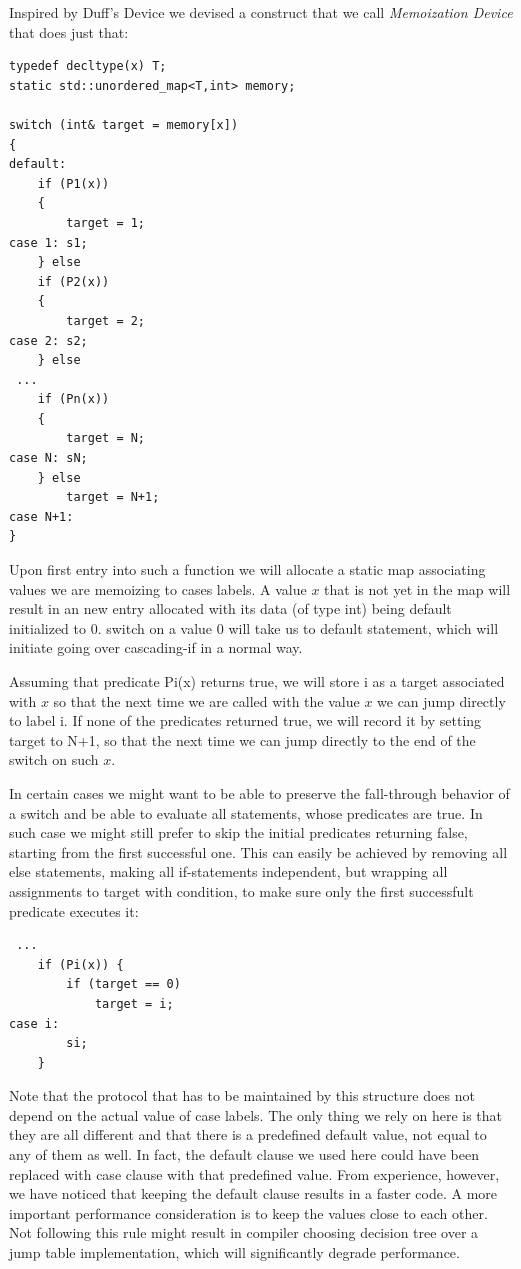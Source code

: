 \documentclass[preprint]{sigplanconf}
\begin{document}
Inspired by Duff's Device\cite{Duff} we devised a construct that we call 
\emph{Memoization Device} that does just that:

\begin{lstlisting}
typedef decltype(x) T;
static std::unordered_map<T,int> memory;

switch (int& target = memory[x])
{
default:
    if (P1(x)) 
    {
        target = 1;
case 1: s1;
    } else 
    if (P2(x)) 
    {
        target = 2;
case 2: s2;
    } else
 ...
    if (Pn(x)) 
    {
        target = N;
case N: sN;
    } else
        target = N+1;
case N+1:
}
\end{lstlisting}

Upon first entry into such a function we will allocate a static map associating 
values we are memoizing to cases labels. A value $x$ that is not yet in the map 
will result in an new entry allocated with its data (of type int) being default 
initialized to 0. switch on a value 0 will take us to default statement, which 
will initiate going over cascading-if in a normal way. 

Assuming that predicate Pi(x) returns true, we will store i as a target 
associated with $x$ so that the next time we are called with the value $x$ we 
can jump directly to label i. If none of the predicates returned true, we will 
record it by setting target to N+1, so that the next time we can jump directly 
to the end of the switch on such $x$. 

In certain cases we might want to be able to preserve the fall-through behavior 
of a switch and be able to evaluate all statements, whose predicates are true. 
In such case we might still prefer to skip the initial predicates returning 
false, starting from the first successful one. This can easily be achieved by 
removing all else statements, making all if-statements independent, but wrapping 
all assignments to target with condition, to make sure only the first 
successfult predicate executes it:

\begin{lstlisting}
 ...
    if (Pi(x)) { 
        if (target == 0)
            target = i;
case i:
        si;
    }
\end{lstlisting}

Note that the protocol that has to be maintained by this structure does not 
depend on the actual value of case labels. The only thing we rely on here is 
that they are all different and that there is a predefined default value, not 
equal to any of them as well. In fact, the default clause we used here could 
have been replaced with case clause with that predefined value. From experience,
however, we have noticed that keeping the default clause results in a faster 
code. A more important performance consideration is to keep the values close to
each other. Not following this rule might result in compiler choosing decision 
tree over a jump table implementation, which will significantly degrade 
performance.
\end{document}
